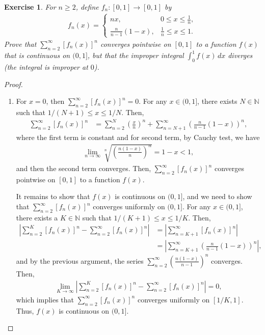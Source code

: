 \documentclass[11pt]{article}
\newtheorem{exercise}{Exercise}[section]
\theoremstyle{definition}
\numberwithin{equation}{subsection}
\begin{document}
\begin{exercise}{\rm *}
For $n \geq 2$, define $f_n: [0,1] \to [0,1]$ by
\begin{align*}
    f_n(x) = \begin{cases}
        nx, & 0 \displaystyle \leq x \leq \frac{1}{n}, \\
        \displaystyle \frac{n}{n-1}(1 - x), & \displaystyle \frac{1}{n} \leq x \leq 1.
    \end{cases}
\end{align*}
Prove that $\displaystyle \sum^\infty_{n=2} [f_n(x)]^n$ converges pointwise on $[0,1]$ to a function $f(x)$ that is continuous on $(0,1]$, but that the improper integral $\displaystyle \int^1_0 f(x)\, dx$ diverges (the integral is improper at $0$). 
\end{exercise}
\begin{proof}
~\begin{enumerate}[label=(\alph*)]
    \item For $x = 0$, then $\displaystyle \sum^\infty_{n=2} [f_n(x)]^n = 0$. For any $x \in (0,1]$, there exists $N \in \mathbb{N}$ such that $1 / (N+1) \leq x \leq 1 / N$. Then,
    \begin{align*}
        \sum^\infty_{n=2} [f_n(x)]^n & = \sum^N_{n = 2} \left( \frac{x}{n} \right)^n + \sum^\infty_{n=N+1} \left( \frac{n}{n - 1} (1-x) \right)^n,
    \end{align*}
    where the first term is constant and for second term, by Cauchy test, we have
    \begin{align*}
        \lim_{n \to \infty} \sqrt[n]{\left( \frac{n(1 - x)}{n} \right)^n} = 1 - x < 1,
    \end{align*}
    and then the second term converges. Then, $\displaystyle \sum^\infty_{n=2} [f_n(x)]^n$ converges pointwise on $[0,1]$ to a function $f(x)$.
    
    It remains to show that $f(x)$ is continuous on $(0,1]$, and we need to show that $\displaystyle \sum^\infty_{n=2} [f_n(x)]^n$ converges uniformly on $(0,1]$. For any $x \in (0,1]$, there exists a $K \in \mathbb{N}$ such that $1 / (K+1) \leq x \leq 1 / K$. Then, 
    \begin{align*}
        \left| \sum^K_{n=2} [f_n(x)]^n - \sum^\infty_{n=2} [f_n(x)]^n \right| & = \left| \sum^\infty_{n=K+1} [f_n(x)]^n\right| \\
        & = \left| \sum^\infty_{n=K+1} \left( \frac{n}{n - 1} (1-x) \right)^n \right|,
    \end{align*}
    and by the previous argument, the series $\displaystyle \sum^\infty_{n=2} \left(\frac{n(1-x)}{n-1}\right)^n$ converges. Then, 
    \begin{align*}
        \lim_{K \to \infty} \left| \sum^K_{n=2} [f_n(x)]^n - \sum^\infty_{n=2} [f_n(x)]^n \right| = 0,
    \end{align*}
    which implies that $\displaystyle \sum^\infty_{n=2} [f_n(x)]^n$ converges uniformly on $[1/K, 1]$. Thus, $f(x)$ is continuous on $(0,1]$.
    

\end{enumerate}
\end{proof}
\end{document}
